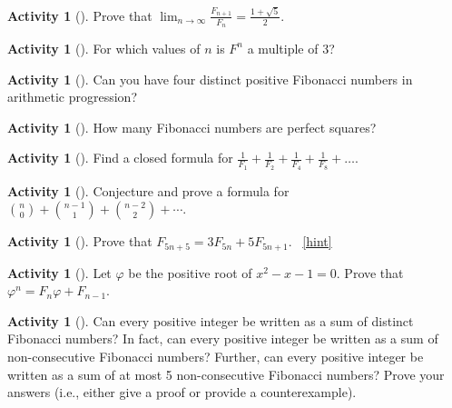 \documentclass[10pt,]{book}
\theoremstyle{plain}
\theoremstyle{definition}
\theoremstyle{definition}
\theoremstyle{definition}
\newtheorem{activity}[project]{Activity}
\numberwithin{equation}{chapter}
\begin{document}
\begin{activity}[]\label{activity-156}
\hypertarget{p-980}{}%
Prove that \(\lim_{n\to\infty}\frac{F_{n + 1}}{F_{n}} = \frac{1 + \sqrt{5}}{2}.\)%
\end{activity}
\begin{activity}[]\label{activity-157}
\hypertarget{p-981}{}%
For which values of \(n\) is \(F^{n}\) a multiple of 3?%
\end{activity}
\begin{activity}[]\label{activity-158}
\hypertarget{p-982}{}%
Can you have four distinct positive Fibonacci numbers in arithmetic progression?%
\end{activity}
\begin{activity}[]\label{activity-159}
\hypertarget{p-983}{}%
How many Fibonacci numbers are perfect squares?%
\end{activity}
\begin{activity}[]\label{activity-160}
\hypertarget{p-984}{}%
Find a closed formula for \(\frac{1}{F_{1}} + \frac{1}{F_{2}} + \frac{1}{F_{4}} + \frac{1}{F_{8}} + \ldots.\)%
\end{activity}
\begin{activity}[]\label{activity-161}
\hypertarget{p-985}{}%
Conjecture and prove a formula for \(\binom{n}{0} + \binom{n-1}{1} + \binom{n-2}{2} + \cdots\).%
\end{activity}
\begin{activity}[]\label{activity-162}
\hypertarget{p-986}{}%
Prove that \(F_{5n + 5} = 3F_{5n} + 5F_{5n + 1}\).%
~\hfill{\tiny\hyperlink{a-169}{[hint]}\hypertarget{q-169}{}}\end{activity}
\begin{activity}[]\label{activity-163}
\hypertarget{p-988}{}%
Let \(\varphi\) be the positive root of \(x^{2} - x - 1 = 0\). Prove that \(\varphi^{n} = F_{n}\varphi + F_{n - 1}\).%
\end{activity}
\begin{activity}[]\label{activity-164}
\hypertarget{p-989}{}%
Can every positive integer be written as a sum of distinct Fibonacci numbers?  In fact, can every positive integer be written as a sum of non-consecutive Fibonacci numbers?  Further, can every positive integer be written as a sum of at most 5 non-consecutive Fibonacci numbers?  Prove your answers (i.e., either give a proof or provide a counterexample).%
\end{activity}
\typeout{************************************************}
\typeout{************************************************}
\end{document}
